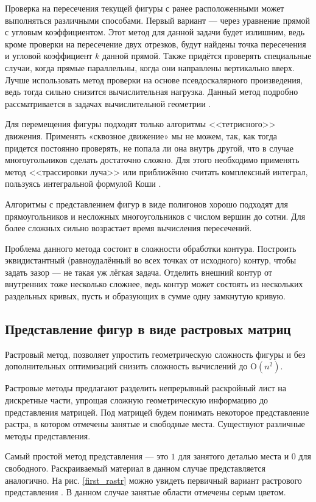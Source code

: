 \documentclass[14pt]{extarticle}
\begin{document}
	Проверка на пересечения текущей фигуры с ранее расположенными может выполняться различными способами. Первый вариант --- через уравнение прямой с угловым коэффициентом. Этот метод для данной задачи будет излишним, ведь кроме проверки на пересечение двух отрезков, будут найдены точка пересечения и угловой коэффициент $k$ данной прямой. Также придётся проверять специальные случаи, когда прямые параллельны, когда они направлены вертикально вверх. Лучше использовать метод проверки на основе псевдоскалярного произведения, ведь тогда сильно снизится вычислительная нагрузка. Данный метод подробно рассматривается в задачах вычислительной геометрии \cite{Parsolov}.


	Для перемещения фигуры подходят только алгоритмы <<тетрисного>> движения. Применять «сквозное движение» мы не можем, так, как тогда придется постоянно проверять, не попала ли она внутрь другой, что в случае многоугольников сделать достаточно сложно. Для этого необходимо применять метод <<трассировки луча>> или приближённо считать комплексный интеграл, пользуясь интегральной формулой Коши \cite{Shabat}.


	Алгоритмы с представлением фигур в виде полигонов хорошо подходят для прямоугольников и несложных многоугольников с числом вершин до сотни. Для более сложных сильно возрастает время вычисления пересечений.


	Проблема данного метода состоит в сложности обработки контура. Построить эквидистантный (равноудалённый во всех точках от исходного) контур, чтобы задать зазор --- не
	такая уж лёгкая задача. Отделить внешний контур от внутренних тоже несколько сложнее,
	ведь контур может состоять из нескольких раздельных кривых, пусть и образующих в
	сумме одну замкнутую кривую.
	\subsection{Представление фигур в виде растровых матриц}
	Растровый метод, позволяет упростить геометрическую сложность фигуры и без дополнительных оптимизаций снизить сложность вычислений до $\mathrm{O}(n^2)$.


	Растровые методы предлагают разделить непрерывный раскройный лист на дискретные части, упрощая сложную геометрическую информацию до представления матрицей. Под матрицей будем понимать некоторое представление растра, в котором отмечены занятые и свободные места. Существуют различные методы представления.


	Самый простой метод представления --- это $1$ для занятого деталью места и $0$ для свободного. Раскраиваемый материал в данном случае представляется аналогично. На рис. \ref{first_rastr}
	можно увидеть первичный вариант растрового представления \cite{Benell_Olivera}. В данном случае занятые области отмечены серым цветом.
	
\end{document}
